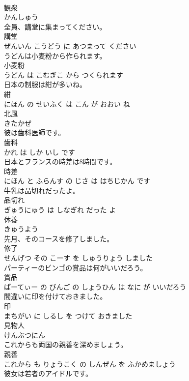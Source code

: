 \documentclass[8pt]{extreport}
\begin{document}
\begin{CJK}{UTF8}{min}
\\	観衆	
\\	かんしゅう		
\\	全員、講堂に集まってください。	
\\	講堂 
\\	ぜんいん こうどう に あつまって ください			
\\	うどんは小麦粉から作られます。	
\\	小麦粉 
\\	うどん は こむぎこ から つくられます			
\\	日本の制服は紺が多いね。	
\\	紺 
\\	にほん の せいふく は こん が おおい ね			
\\	北風	
\\	きたかぜ		
\\	彼は歯科医師です。	
\\	歯科 
\\	かれ は しか いし です			
\\	日本とフランスの時差は8時間です。	
\\	時差 
\\	にほん と ふらんす の じさ は はちじかん です			
\\	牛乳は品切れだったよ。	
\\	品切れ 
\\	ぎゅうにゅう は しなぎれ だった よ			
\\	休養	
\\	きゅうよう		
\\	先月、そのコースを修了しました。	
\\	修了 
\\	せんげつ その こーす を しゅうりょう しました			
\\	パーティーのビンゴの賞品は何がいいだろう。	
\\	賞品 
\\	ぱーてぃー の びんご の しょうひん は なに が いいだろう			
\\	間違いに印を付けておきました。	
\\	印 
\\	まちがい に しるし を つけて おきました			
\\	見物人	
\\	けんぶつにん		
\\	これからも両国の親善を深めましょう。	
\\	親善 
\\	これから も りょうこく の しんぜん を ふかめましょう			
\\	彼女は若者のアイドルです。	

\end{CJK}
\end{document}

